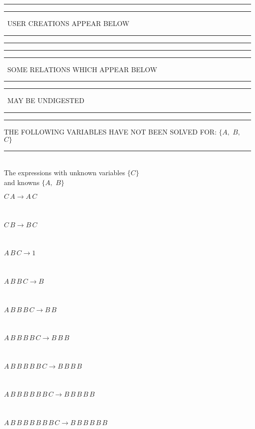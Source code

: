 \rule[2pt]{6in}{1pt}\hfil\break
\rule[2.5pt]{1.701in}{1pt}
\ USER CREATIONS APPEAR BELOW\ 
\rule[2.5pt]{1.701in}{1pt}\hfil\break
\rule[2pt]{6in}{1pt}\hfil\break
\rule[2pt]{6in}{4pt}\hfil\break
\rule[2pt]{1.45in}{4pt}
\ SOME RELATIONS WHICH APPEAR BELOW\ 
\rule[2pt]{1.45in}{4pt}\hfil\break
\rule[2pt]{2.18in}{4pt}
\ MAY BE UNDIGESTED\ 
\rule[2pt]{2.18in}{4pt}\hfil\break
\rule[2pt]{6in}{4pt}\hfil\break
THE FOLLOWING VARIABLES HAVE NOT BEEN SOLVED FOR:\hfil\break
$\{A,
$ $
B,
$ $
C\}$
\smallskip\\
\rule[3pt]{6in}{.7pt}\\
The expressions with unknown variables $\{C\}$\\
and knowns $\{A,
$ $
B\}$\smallskip\\
\begin{minipage}{6in}
$
C\,
 A\rightarrow A\,
 C
$
\end{minipage}\medskip \\
\begin{minipage}{6in}
$
C\,
 B\rightarrow B\,
 C
$
\end{minipage}\medskip \\
\begin{minipage}{6in}
$
A\,
 B\,
 C\rightarrow 1
$
\end{minipage}\medskip \\
\begin{minipage}{6in}
$
A\,
 B\,
 B\,
 C\rightarrow B
$
\end{minipage}\medskip \\
\begin{minipage}{6in}
$
A\,
 B\,
 B\,
 B\,
 C\rightarrow B\,
 B
$
\end{minipage}\medskip \\
\begin{minipage}{6in}
$
A\,
 B\,
 B\,
 B\,
 B\,
 C\rightarrow B\,
 B\,
 B
$
\end{minipage}\medskip \\
\begin{minipage}{6in}
$
A\,
 B\,
 B\,
 B\,
 B\,
 B\,
 C\rightarrow B\,
 B\,
 B\,
 B
$
\end{minipage}\medskip \\
\begin{minipage}{6in}
$
A\,
 B\,
 B\,
 B\,
 B\,
 B\,
 B\,
 C\rightarrow B\,
 B\,
 B\,
 B\,
 B
$
\end{minipage}\medskip \\
\begin{minipage}{6in}
$
A\,
 B\,
 B\,
 B\,
 B\,
 B\,
 B\,
 B\,
 C\rightarrow B\,
 B\,
 B\,
 B\,
 B\,
 B
$
\end{minipage}\\
\vspace{10pt}

